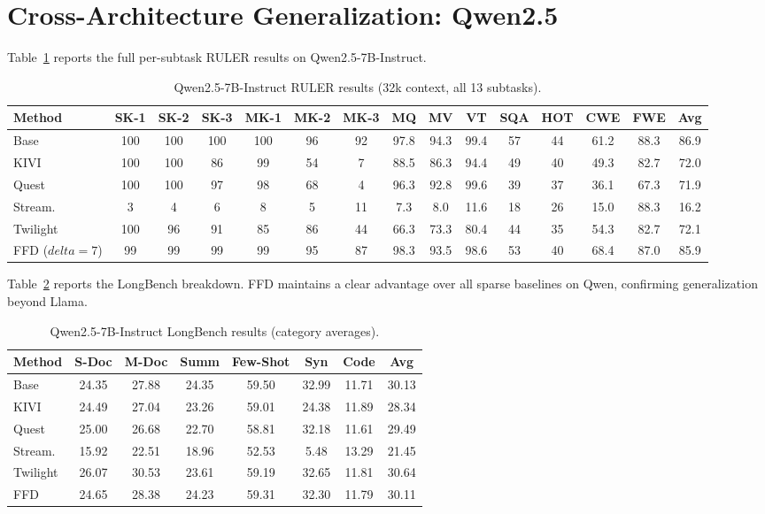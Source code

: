 \documentclass[]{mosi}
\def\delta{delta}%
\theoremstyle{plain}
\theoremstyle{definition}
\theoremstyle{remark}
\begin{document}
\section{Cross-Architecture Generalization: Qwen2.5}
\label{app:qwen}

Table~\ref{tab:qwen_ruler} reports the full per-subtask RULER results on Qwen2.5-7B-Instruct.

\begin{table}[h]
\caption{Qwen2.5-7B-Instruct RULER results (32k context, all 13 subtasks).}
\label{tab:qwen_ruler}
\begin{center}
\footnotesize
\begin{tabular}{lcccccccccccccc}
\toprule
Method & SK-1 & SK-2 & SK-3 & MK-1 & MK-2 & MK-3 & MQ & MV & VT & SQA & HOT & CWE & FWE & Avg \\
\midrule
Base & 100 & 100 & 100 & 100 & 96 & 92 & 97.8 & 94.3 & 99.4 & 57 & 44 & 61.2 & 88.3 & 86.9 \\
KIVI & 100 & 100 & 86 & 99 & 54 & 7 & 88.5 & 86.3 & 94.4 & 49 & 40 & 49.3 & 82.7 & 72.0 \\
Quest & 100 & 100 & 97 & 98 & 68 & 4 & 96.3 & 92.8 & 99.6 & 39 & 37 & 36.1 & 67.3 & 71.9 \\
Stream. & 3 & 4 & 6 & 8 & 5 & 11 & 7.3 & 8.0 & 11.6 & 18 & 26 & 15.0 & 88.3 & 16.2 \\
Twilight & 100 & 96 & 91 & 85 & 86 & 44 & 66.3 & 73.3 & 80.4 & 44 & 35 & 54.3 & 82.7 & 72.1 \\
FFD ($\delta=7$) & 99 & 99 & 99 & 99 & 95 & 87 & 98.3 & 93.5 & 98.6 & 53 & 40 & 68.4 & 87.0 & 85.9 \\
\bottomrule
\end{tabular}
\end{center}
\end{table}

Table~\ref{tab:qwen_longbench} reports the LongBench breakdown. FFD maintains a clear advantage over all sparse baselines on Qwen, confirming generalization beyond Llama.

\begin{table}[h]
\caption{Qwen2.5-7B-Instruct LongBench results (category averages).}
\label{tab:qwen_longbench}
\begin{center}
\begin{tabular}{lccccccc}
\toprule
Method & S-Doc & M-Doc & Summ & Few-Shot & Syn & Code & Avg \\
\midrule
Base    & 24.35 & 27.88 & 24.35 & 59.50 & 32.99 & 11.71 & 30.13 \\
KIVI    & 24.49 & 27.04 & 23.26 & 59.01 & 24.38 & 11.89 & 28.34 \\
Quest   & 25.00 & 26.68 & 22.70 & 58.81 & 32.18 & 11.61 & 29.49 \\
Stream. & 15.92 & 22.51 & 18.96 & 52.53 &  5.48 & 13.29 & 21.45 \\
Twilight & 26.07 & 30.53 & 23.61 & 59.19 & 32.65 & 11.81 & 30.64 \\
FFD     & 24.65 & 28.38 & 24.23 & 59.31 & 32.30 & 11.79 & 30.11 \\
\bottomrule
\end{tabular}
\end{center}
\end{table}
\end{document}

